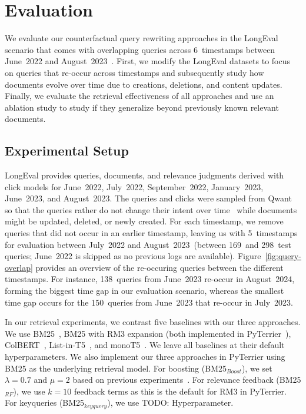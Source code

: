 \section{Evaluation}

We evaluate our counterfactual query rewriting approaches in the LongEval scenario that comes with overlapping queries across 6~timestamps between June~2022 and August~2023~\cite{alkhalifa:2023,alkhalifa:2024,galuscakova:2023}. First, we modify the LongEval datasets to focus on queries that re-occur across timestamps and subsequently study how documents evolve over time due to creations, deletions, and content updates. Finally, we evaluate the retrieval effectiveness of all approaches and use an ablation study to study if they generalize beyond previously known relevant documents.

\subsection{Experimental Setup}

LongEval provides queries, documents, and relevance judgments derived with click models for June~2022, July~2022, September~2022, January~2023, June~2023, and August~2023. The queries and clicks were sampled from Qwant so that the queries rather do not change their intent over time~\cite{galuscakova:2023} while documents might be updated, deleted, or newly created. For each timestamp, we remove queries that did not occur in an earlier timestamp, leaving us with 5~timestamps for evaluation between July~2022 and August~2023~(between 169~and 298~test queries; June~2022 is skipped as no previous logs are available). Figure~\ref{fig:query-overlap} provides an overview of the re-occuring queries between the different timestamps. For instance, 138~queries from June~2023 re-occur in August~2024, forming the biggest time gap in our evaluation scenario, whereas the smallest time gap occurs for the 150~queries from June~2023 that re-occur in July~2023.

In our retrieval experiments, we contrast five baselines with our three approaches. We use BM25~\cite{robertson:1994}, BM25 with RM3 expansion (both implemented in PyTerrier~\cite{macdonald:2020}), ColBERT~\cite{khattab:2020}, List-in-T5~\cite{tamber:2023}, and monoT5~\cite{nogueira:2020}. We leave all baselines at their default hyperparameters. We also implement our three approaches in PyTerrier using BM25 as the underlying retrieval model. For boosting (BM25$_{Boost}$), we set $\lambda=0.7$ and $\mu=2$ based on previous experiments~\cite{keller:2024b}. For relevance feedback (BM25$_{RF}$), we use $k=10$ feedback terms as this is the default for RM3 in PyTerrier. For keyqueries (BM25$_{keyquery}$), we use {\color{red} TODO: Hyperparameter}.

